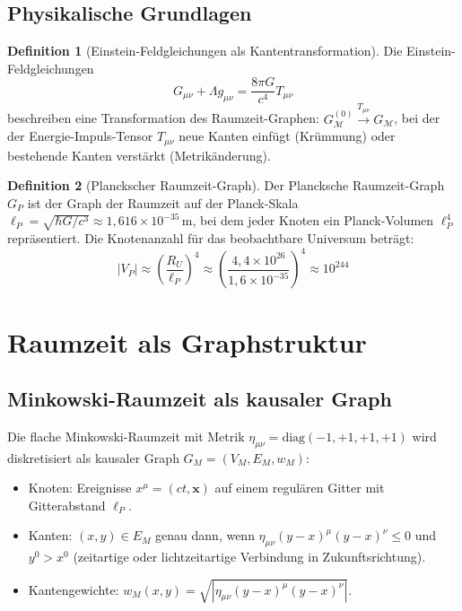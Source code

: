 ﻿\documentclass[a4paper,12pt]{article}
\theoremstyle{definition}
\newtheorem{definition}{Definition}
\begin{document}
\subsection{Physikalische Grundlagen}

\begin{definition}[Einstein-Feld\-gleichungen als Kantentransformation]
	Die Einstein-Feldgleichungen
	\[
	G_{\mu\nu} + \Lambda g_{\mu\nu} = \frac{8\pi G}{c^4} T_{\mu\nu}
	\]
	beschreiben eine Transformation des Raumzeit-Graphen:
	$G_{\mathcal{M}}^{(0)} \xrightarrow{T_{\mu\nu}} G_{\mathcal{M}}$,
	bei der der Energie-Impuls-Tensor $T_{\mu\nu}$ neue Kanten einf\"ugt
	(Kr\"ummung) oder bestehende Kanten verst\"arkt (Metrik\"anderung).
\end{definition}

\begin{definition}[Planckscher Raumzeit-Graph]
	Der Plancksche Raumzeit-Graph $G_P$ ist der Graph der Raumzeit auf der
	Planck-Skala $\ell_P = \sqrt{\hbar G/c^3} \approx 1{,}616 \times 10^{-35}$\,m,
	bei dem jeder Knoten ein Planck-Volumen $\ell_P^4$ repr\"asentiert.
	Die Knoten\-anzahl f\"ur das beobachtbare Universum betr\"agt:
	\[
	|V_P| \approx \left(\frac{R_U}{\ell_P}\right)^4 \approx \left(\frac{4{,}4 \times 10^{26}}{1{,}6 \times 10^{-35}}\right)^4 \approx 10^{244}
	\]
\end{definition}

\section{Raumzeit als Graphstruktur}

\subsection{Minkowski-Raumzeit als kausaler Graph}

Die flache Minkowski-Raumzeit mit Metrik $\eta_{\mu\nu} = \mathrm{diag}(-1,+1,+1,+1)$
wird diskretisiert als kausaler Graph $G_M = (V_M, E_M, w_M)$:

\begin{itemize}
	\item Knoten: Ereignisse $x^\mu = (ct, \mathbf{x})$ auf einem regul\"aren
	      Gitter mit Gitterabstand $\ell_P$.
	\item Kanten: $(x, y) \in E_M$ genau dann, wenn
	      $\eta_{\mu\nu}(y-x)^\mu(y-x)^\nu \leq 0$ und $y^0 > x^0$
	      (zeitartige oder lichtzeitartige Verbindung in Zukunftsrichtung).
	\item Kantengewichte: $w_M(x,y) = \sqrt{|\eta_{\mu\nu}(y-x)^\mu(y-x)^\nu|}$.
\end{itemize}
\end{document}
